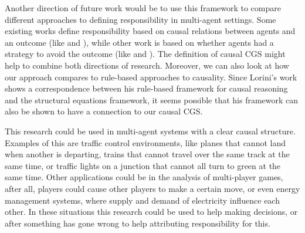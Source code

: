 Another direction of future work would be to use this framework to compare different approaches to defining responsibility in multi-agent settings. Some existing works define responsibility based on causal relations between agents and an outcome (like \cite{Alechina_Halpern_Logan_2020,chockler2004responsibility,Friedenberg_Halpern_2019} and \cite{Beckers2023moral}), while other work is based on whether agents had a strategy to avoid the outcome (like \cite{baier2021game} and \cite{yazdanpanah2019strategic}). The definition of causal CGS might help to combine both directions of research.
Moreover, we can also look at how our approach compares to rule-based approaches to causality. Since Lorini's \cite{lorni2023rule} work shows a correspondence between his rule-based framework for causal reasoning and the structural equations framework, it seems possible that his framework can also be shown to have a connection to our causal CGS.

This research could be used in multi-agent systems with a clear causal structure. Examples of this are traffic control environments, like planes that cannot land when another is departing, trains that cannot travel over the same track at the same time, or traffic lights on a junction that cannot all turn to green at the same time. 
Other applications could be in the analysis of multi-player games, after all, players could cause other players to make a certain move, or even energy management systems, where supply and demand of electricity influence each other. 
In these situations this research could be used to help making decisions, or after something has gone wrong to help attributing responsibility for this.
\balance